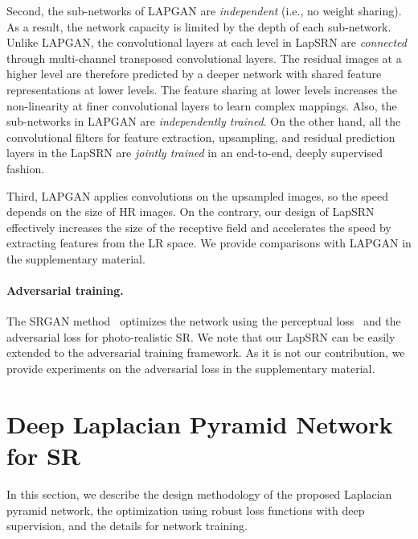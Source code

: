 \documentclass[10pt,twocolumn,letterpaper]{article}
\begin{document}
	Second, the sub-networks of LAPGAN are \emph{independent} (i.e., no weight sharing).
	As a result, the network capacity is limited by the depth of each sub-network.
	Unlike LAPGAN, the convolutional layers at each level in LapSRN are \emph{connected} through multi-channel transposed convolutional layers.
	The residual images at a higher level are therefore predicted by a deeper network with shared feature representations at lower levels.
	The feature sharing at lower levels increases the non-linearity at finer convolutional layers to learn complex mappings.
	Also, the sub-networks in LAPGAN are \emph{independently trained}.
	On the other hand, all the convolutional filters for feature extraction, upsampling, and residual prediction layers in the LapSRN are \emph{jointly trained} in an end-to-end, deeply supervised fashion.
	
	Third, LAPGAN applies convolutions on the upsampled images, so the speed depends on the size of HR images.
	On the contrary, our design of LapSRN effectively increases the size of the receptive field and accelerates the speed by extracting features from the LR space.
	We provide comparisons with LAPGAN in the supplementary material.
	
	
	\noindent\paragraph{Adversarial training.} 
	The SRGAN method~\cite{SRGAN} optimizes the network using the perceptual loss~\cite{Johnson-ECCV-2016} and the adversarial loss for photo-realistic SR.
	We note that our LapSRN can be easily extended to the adversarial training framework.
	As it is not our contribution, we provide experiments on the adversarial loss in the supplementary material.
	
	
	\clearpage
	\section{Deep Laplacian Pyramid Network for SR}
	\label{sec:framework}
	\vspace{-0.1cm}
	In this section, we describe the design methodology of the proposed Laplacian pyramid network, the optimization using robust loss functions with deep supervision, and the details for network training.
	
\end{document}
